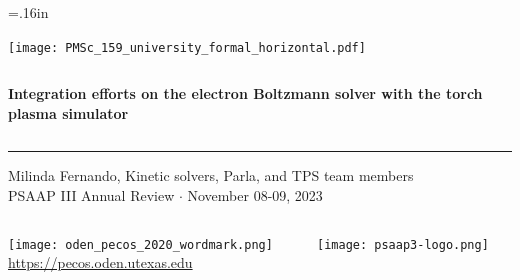 \documentclass[mathserif, aspectratio=169]{beamer}
\begin{document}


\hoffset=.16in

\begin{frame}[plain,t]{}
\makeatletter
\texttt{[image: PMSc\_159\_university\_formal\_horizontal.pdf]} \newline
\begin{columns}[T,onlytextwidth]
{\bf \color{burntorange} \selectfont 
Integration efforts on the electron Boltzmann solver with the torch plasma simulator
}
\end{columns}
\vspace*{.15cm}
\rule{.8\textwidth}{0.6pt} \newline

\vspace*{0.05cm}
{\selectfont
  { \scriptsize
    Milinda Fernando, Kinetic solvers, Parla, and TPS team members \\
  }
  {\color{burntorange} \tiny
    PSAAP III Annual Review $\cdot$ November 08-09, 2023
  }
}

\vspace*{1cm}
\begin{columns}
\begin{column}{0.8\linewidth}
\texttt{[image: oden\_pecos\_2020\_wordmark.png]}\\
{\scriptsize \url{https://pecos.oden.utexas.edu}}
\end{column}

\begin{column}{0.2\linewidth}
\texttt{[image: psaap3-logo.png]}
\end{column}
\end{columns}

\end{frame}
\hoffset=0in
\end{document}
